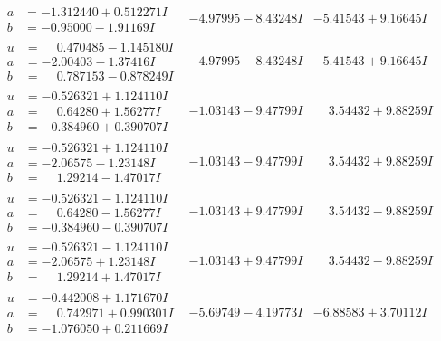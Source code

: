 \documentclass[1p]{elsarticle_modified}
\theoremstyle{definition}
\begin{document}
$$\begin{array}{c|c|c}
\begin{aligned}
a &= -1.312440 + 0.512271 I \\
b &= -0.95000 - 1.91169 I\end{aligned}
 & -4.97995 - 8.43248 I & -5.41543 + 9.16645 I \\ \hline\begin{aligned}
u &= \phantom{-}0.470485 - 1.145180 I \\
a &= -2.00403 - 1.37416 I \\
b &= \phantom{-}0.787153 - 0.878249 I\end{aligned}
 & -4.97995 - 8.43248 I & -5.41543 + 9.16645 I \\ \hline\begin{aligned}
u &= -0.526321 + 1.124110 I \\
a &= \phantom{-}0.64280 + 1.56277 I \\
b &= -0.384960 + 0.390707 I\end{aligned}
 & -1.03143 - 9.47799 I & \phantom{-}3.54432 + 9.88259 I \\ \hline\begin{aligned}
u &= -0.526321 + 1.124110 I \\
a &= -2.06575 - 1.23148 I \\
b &= \phantom{-}1.29214 - 1.47017 I\end{aligned}
 & -1.03143 - 9.47799 I & \phantom{-}3.54432 + 9.88259 I \\ \hline\begin{aligned}
u &= -0.526321 - 1.124110 I \\
a &= \phantom{-}0.64280 - 1.56277 I \\
b &= -0.384960 - 0.390707 I\end{aligned}
 & -1.03143 + 9.47799 I & \phantom{-}3.54432 - 9.88259 I \\ \hline\begin{aligned}
u &= -0.526321 - 1.124110 I \\
a &= -2.06575 + 1.23148 I \\
b &= \phantom{-}1.29214 + 1.47017 I\end{aligned}
 & -1.03143 + 9.47799 I & \phantom{-}3.54432 - 9.88259 I \\ \hline\begin{aligned}
u &= -0.442008 + 1.171670 I \\
a &= \phantom{-}0.742971 + 0.990301 I \\
b &= -1.076050 + 0.211669 I\end{aligned}
 & -5.69749 - 4.19773 I & -6.88583 + 3.70112 I \\ \hline\begin{aligned}

\end{aligned}
\end{array}$$
\end{document}
